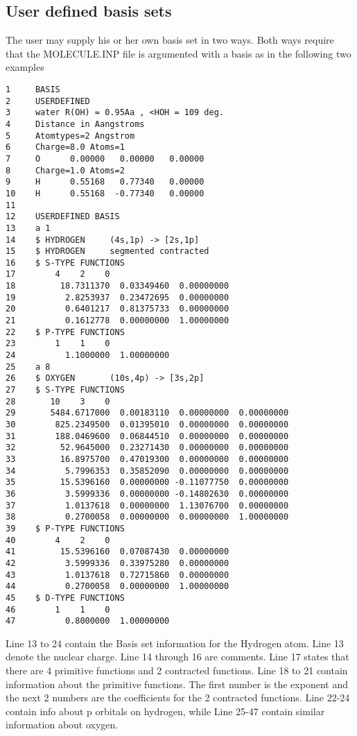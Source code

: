 \subsection{User defined basis sets}

The user may supply his or her own basis set in two ways. Both ways require that the MOLECULE.INP file is argumented with a basis as in the following two examples

\begin{verbatim}
1     BASIS
2     USERDEFINED
3     water R(OH) = 0.95Aa , <HOH = 109 deg.
4     Distance in Aangstroms
5     Atomtypes=2 Angstrom
6     Charge=8.0 Atoms=1
7     O      0.00000   0.00000   0.00000
8     Charge=1.0 Atoms=2
9     H      0.55168   0.77340   0.00000
10    H      0.55168  -0.77340   0.00000
11 
12    USERDEFINED BASIS
13    a 1
14    $ HYDROGEN     (4s,1p) -> [2s,1p]
15    $ HYDROGEN     segmented contracted
16    $ S-TYPE FUNCTIONS
17        4    2    0
18         18.7311370  0.03349460  0.00000000
19          2.8253937  0.23472695  0.00000000
20          0.6401217  0.81375733  0.00000000
21          0.1612778  0.00000000  1.00000000
22    $ P-TYPE FUNCTIONS
23        1    1    0
24          1.1000000  1.00000000
25    a 8
26    $ OXYGEN       (10s,4p) -> [3s,2p]                               
27    $ S-TYPE FUNCTIONS
28       10    3    0
29       5484.6717000  0.00183110  0.00000000  0.00000000
30        825.2349500  0.01395010  0.00000000  0.00000000
31        188.0469600  0.06844510  0.00000000  0.00000000
32         52.9645000  0.23271430  0.00000000  0.00000000
33         16.8975700  0.47019300  0.00000000  0.00000000
34          5.7996353  0.35852090  0.00000000  0.00000000
35         15.5396160  0.00000000 -0.11077750  0.00000000
36          3.5999336  0.00000000 -0.14802630  0.00000000
37          1.0137618  0.00000000  1.13076700  0.00000000
38          0.2700058  0.00000000  0.00000000  1.00000000
39    $ P-TYPE FUNCTIONS
40        4    2    0
41         15.5396160  0.07087430  0.00000000
42          3.5999336  0.33975280  0.00000000
43          1.0137618  0.72715860  0.00000000
44          0.2700058  0.00000000  1.00000000
45    $ D-TYPE FUNCTIONS
46        1    1    0
47          0.8000000  1.00000000
\end{verbatim} 
Line 13 to 24 contain the Basis set information for the Hydrogen atom. 
Line 13 denote the nuclear charge. Line 14 through 16 are comments. Line 17 states 
that there are 4 primitive functions and 2 contracted functions.
Line 18 to 21 contain information about the primitive functions. The first number is the exponent 
and the next 2 numbers are the coefficients for the 2 contracted functions.
Line 22-24 contain info about p orbitals on hydrogen, while Line 25-47 contain similar information 
about oxygen.

